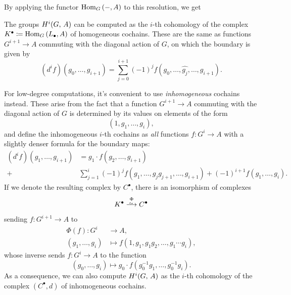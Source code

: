 \documentclass[a4paper, oneside]{memoir}
\begin{document}
By applying the functor $\operatorname{Hom}_G{(-,A)}$ to this resolution, we get
\begin{theorem}
	The groups $H^{i}( G, \, A )$ can be computed as the $i$-th cohomology of the complex $K^\bullet\coloneqq \operatorname{Hom}_G{(L_\bullet,A)}$ of \textnormal{homogeneous} cochains. These are the same as functions $G^{i+1}\to A$ commuting with the diagonal action of $G$, on which the boundary is given by
	\[
		(d^i f)(g_0,\dots , g_{i+1})=\sum_{j=0}^{i+1} (-1)^j f(g_0,\dots , \hat{g_j},\dots , g_{i+1}).
	\]
\end{theorem}

For low-degree computations, it's convenient to use \textit{inhomogeneous} cochains instead. These arise from the fact that a function $G^{i+1}\to A$ commuting with the diagonal action of $G$ is determined by its values on elements of the form \[(1,g_1,\dots , g_i),\] and define the inhomogeneous $i$-th cochains as \textit{all} functions $f: G^i\to A$ with a slightly denser formula for the boundary maps:
\begin{equation}\label{eq:Coboundary}
	\begin{aligned}
		(d^i f)(g_1,\dots , g_{i+1}) & =g_1\cdot f(g_2,\dots , g_{i+1})                                                                \\
		+                            & \sum_{j=1}^{i} (-1)^j f(g_1,\dots , g_j g_{j+1},\dots , g_{i+1})+(-1)^{i+1} f(g_1,\dots , g_i).
	\end{aligned}
\end{equation}
If we denote the resulting complex by $C^\bullet$, there is an isomorphism of complexes
\[
	K^\bullet\overset{\Phi}{\Iso} C^\bullet
\]
sending $f: G^{i+1}\to A$ to
\begin{align*}
	\Phi(f): G^i      & \to A,                                            \\
	(g_1,\dots , g_i) & \mapsto f(1,g_1, g_1 g_2, \dots , g_1\cdots g_i),
\end{align*}
whose inverse sends $f: G^i\to A$ to the function
\[
	(g_0,\dots , g_i)\mapsto g_0\cdot f(g_0^{-1}g_1,\dots , g_0^{-1}g_i).
\]
As a consequence, we can also compute $H^{i}( G, \, A )$ as the $i$-th cohomology of the complex $(C^\bullet, d)$ of inhomogeneous cochains.
\end{document}
